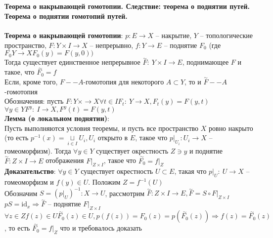 \newpage
\section{}
	\textbf{Теорема о накрывающей гомотопии. Следствие: теорема о поднятии путей. Теорема о поднятии гомотопий путей.}\\
	\\
	\textbf{Теорема о накрывающей гомотопии}: $p: E \rightarrow X$ -- накрытие, $Y$ -- топологические пространство, $F: Y\times I \rightarrow X$ -- непрерывно, $f: Y \rightarrow E$ -- поднятие $F_0$ (где $F_0 Y\rightarrow X F_0 (y) = F(y,0))$\\
	Тогда существует единственное непрерывное $\overset{\sim}{F}:\ Y\times I \rightarrow E$, поднимающее $F$ и такое, что $\overset{\sim}{F_0} = f$\\
	Если, кроме того, $F -- A$-гомотопия для некоторого $A\subset Y$, то и $\overset{\sim}{F} -- A$-гомотопия\\
	Обозначения: пусть $F: Y\times \rightarrow X \forall t\in I F_t:\ Y\rightarrow X, F_t (y) = F(y,t)$\\
	$\forall y \in Y F^y:\ I\rightarrow X, F^y (t) = F(y,t)$\\
	\textbf{Лемма (о локальном поднятии)}:\\
	Пусть выполняются условия теоремы, и пусть все пространство $X$ ровно накрыто (то есть $p^{-1} (x) = \underset{i\in I}{\sqcup} U_i, U_i$ открыто в $E$, такое что ${p|}_{U_i}: U_i \rightarrow X$ -- гомеоморфизм). Тогда $\forall y\in Y$ существует окрестность $Z \ni y$ и поднятие $\overset{\sim}{F}: Z\times I \rightarrow E$ отображения ${F|}_{Z\times I}$, такое что $\overset{\sim}{F_0} = {f|}_Z$\\
	\textbf{Доказательство}: $\forall y\in Y$ существует окрестность $U\subset E$, такая что ${p|}_U:\ U\rightarrow X$ -- гомеоморфизм и $f(y)\in U$. Положим $Z = f^{-1} (U)$\\
	Обозначим $S = ({p|}_U)^{-1}: X\rightarrow U$, рассмотрим $\overset{\sim}{F}: Z\times I \rightarrow E, \overset{\sim}{F} = S \circ {F|}_{Z\times I}$\\
	$pS =  \text{id}_x \Rightarrow \overset{\sim}{F}$ -- поднятие ${F|}_{Z\times I}$\\
	$\forall z\in Z f(z) \in U \overset{\sim}{F_0} (z) \in U, p(f(z)) = F_0 (z) = p(\overset{\sim}{F_0} (z)) \Rightarrow f(z) = \overset{\sim}{F_0} (z)$, то есть $\overset{\sim}{F_0} = {f|}_Z$ что и требовалось доказать\\

